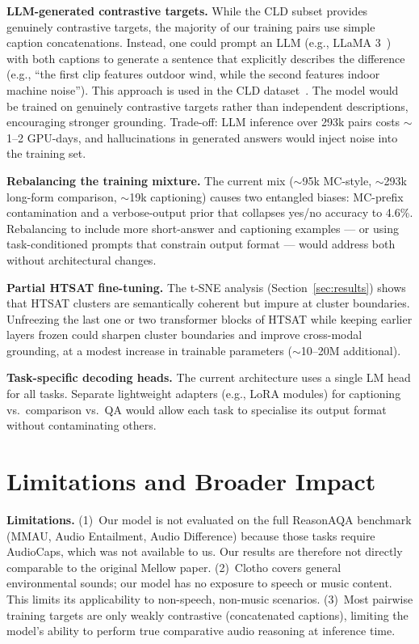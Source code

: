 \documentclass[cameraready]{Interspeech}
\begin{document}
\textbf{LLM-generated contrastive targets.} While the CLD subset provides genuinely contrastive targets, the majority of our training pairs use simple caption concatenations. Instead, one could prompt an LLM (e.g., LLaMA 3~\cite{dubey2024llama}) with
both captions to generate a sentence that explicitly describes the difference (e.g., ``the
first clip features outdoor wind, while the second features indoor machine noise''). This
approach is used in the CLD dataset~\cite{deshmukh2025adiff}. The model would be trained on
genuinely contrastive targets rather than independent descriptions, encouraging stronger
grounding. Trade-off: LLM inference over 293k pairs costs $\sim$1--2 GPU-days, and
hallucinations in generated answers would inject noise into the training set.

\textbf{Rebalancing the training mixture.} The current mix ($\sim$95k MC-style,
$\sim$293k long-form comparison, $\sim$19k captioning) causes two entangled biases: MC-prefix
contamination and a verbose-output prior that collapses yes/no accuracy to 4.6\%.
Rebalancing to include more short-answer and captioning examples — or using task-conditioned
prompts that constrain output format — would address both without architectural changes.

\textbf{Partial HTSAT fine-tuning.} The t-SNE analysis (Section~\ref{sec:results}) shows that
HTSAT clusters are semantically coherent but impure at cluster boundaries. Unfreezing the last
one or two transformer blocks of HTSAT while keeping earlier layers frozen could sharpen
cluster boundaries and improve cross-modal grounding, at a modest increase in trainable
parameters ($\sim$10--20M additional).

\textbf{Task-specific decoding heads.} The current architecture uses a single LM head for all
tasks. Separate lightweight adapters (e.g., LoRA modules) for captioning vs.\ comparison
vs.\ QA would allow each task to specialise its output format without contaminating others.

\section{Limitations and Broader Impact}
\label{sec:limitations}

\textbf{Limitations.}
(1)~Our model is not evaluated on the full ReasonAQA benchmark (MMAU, Audio Entailment,
Audio Difference) because those tasks require AudioCaps, which was not available to us.
Our results are therefore not directly comparable to the original Mellow paper.
(2)~Clotho covers general environmental sounds; our model has no exposure to speech or music
content. This limits its applicability to non-speech, non-music scenarios.
(3)~Most pairwise training targets are only weakly contrastive (concatenated captions), limiting the model's ability to perform true comparative audio reasoning at inference time.
\end{document}
